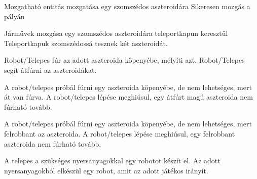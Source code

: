 \documentclass[../../projlab]{subfiles}
\begin{document}
{Mozgatható entitás mozgatása egy szomszédos aszteroidára}
{Sikeresen mozgás a pályán}

{Járművek mozgása egy szomszédos aszteroidára teleportkapun keresztül}
{Teleportkapuk szomszédossá tesznek két aszteroidát.}

{Robot/Telepes fúr az adott aszteroida köpenyébe, mélyíti azt.}
{Robot/Telepes segít átfúrni az aszteroidákat.}

{A robot/telepes próbál fúrni egy aszteroida köpenyébe, de nem lehetséges, mert át van fúrva.}
{A robot/telepes lépése meghiúsul, egy átfúrt magú aszteroida nem fúrható tovább. }

{A robot/telepes próbál fúrni egy aszteroida köpenyébe, de nem lehetséges, mert felrobbant az aszteroida.}
{A robot/telepes lépése meghiúsul, egy felrobbant aszteroida nem fúrható tovább. }

{A telepes a szükséges nyersanyagokkal egy robotot készít el. }
{Az adott nyersanyagokból elkészül egy robot, amit az adott játékos irányít. }
\end{document}
